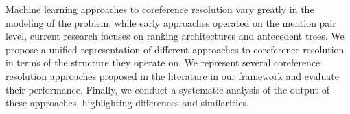 Machine learning approaches to coreference resolution vary greatly in the modeling of the problem: while early approaches operated on the mention pair level, current research focuses on ranking architectures and antecedent trees. We propose a unified representation of different approaches to coreference resolution in terms of the structure they operate on. We represent several coreference resolution approaches proposed in the literature in our framework and evaluate their performance. Finally, we conduct a systematic analysis of the output of these approaches, highlighting differences and similarities.
